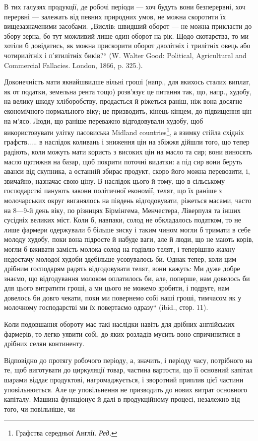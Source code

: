 В тих галузях продукції, де робочі періоди — хоч будуть вони безперервні,
хоч перервні — залежать від певних природних умов, не можна
скоротити їх вищезазначеними засобами. „Вислів: швидший оборот — не
можна прикласти до збору зерна, бо тут можливий лише один оборот
на рік. Щодо скотарства, то ми хотіли б довідатись, як можна прискорити
оборот дволітніх і трилітніх овець або чотирилітніх і п’ятилітніх
биків?“ (W. Walter Good: Political, Agricultural and Commercial Fallacies.
London, 1866, p. 325.).

Доконечність мати якнайшвидше вільні гроші (напр., для якихось сталих
виплат, як от податки, земельна рента тощо) розв’язує це питання
так, що, напр., худобу, на велику шкоду хліборобству, продається й
ріжеться раніш, ніж вона досягне економічного нормального віку; це
призводить, кінець-кінцем, до підвищення цін на м’ясо. Люди, що раніше
переважно відгодовували худобу, щоб використовувати улітку пасовиська
Midland countries\footnote*{
Графства середньої Англії. \emph{Ред.}
}, а взимку стійла східніх графств..... в наслідок коливань
і зниження цін на збіжжя дійшли того, що тепер радіють, коли
можуть мати користь з високих цін на масло та сир; вони виносять масло
щотижня на базар, щоб покрити поточні видатки: а під сир вони беруть
аванси від скупника, а останній збирає продукт, скоро його можна перевозити,
і, звичайно, назначає свою ціну. В наслідок цього й тому, що
в сільському господарстві панують закони політичної економії, телят, що
їх раніше з молочарських округ виганялось на південь відгодовувати,
ріжеться масами, часто на 8—9-й день віку, по різницях Бірмінгема, Менчестера,
Ліверпуля та інших сусідніх великих міст. Коли б, навпаки,
солод не обкладалось податком, то не лише фармери одержували б більше
зиску і таким чином могли б тримати в себе молоду худобу, поки вона
підросте й набуде ваги, але й люди, що не мають корів, могли б вживати
замість молока солод на годівлю телят, і теперішню жахну недостачу
молодої худоби здебільше усовувалось би. Однак тепер, коли цим
дрібним господарям радять відгодовувати телят, вони кажуть: Ми дуже
добре знаємо, що відгодування молоком оплатилось би, але, поперше,
нам довелось би для цього витратити гроші, а ми цього не можемо зробити,
і подруге, нам довелось би довго чекати, поки ми повернемо собі
наші гроші, тимчасом як у молочному господарстві ми їх повертаємо
одразу“ (ibid., стор. 11).

Коли подовшання обороту має такі наслідки навіть для дрібних англійських
фармерів, то легко уявити собі, до яких розладів мусить воно
спричинитися в дрібних селян континенту.

Відповідно до протягу робочого періоду, а, значить, і періоду часу,
потрібного на те, щоб виготувати до циркуляції товар, частина вартости,
що її основний капітал шарами віддає продуктові, нагромаджується, і
зворотний приплив цієї частини уповільнюється. Але це уповільнення не
призводить до нових витрат основного капіталу. Машина функціонує й
далі в продукційному процесі, незалежно від того, чи повільніше, чи
\parbreak{}  %
